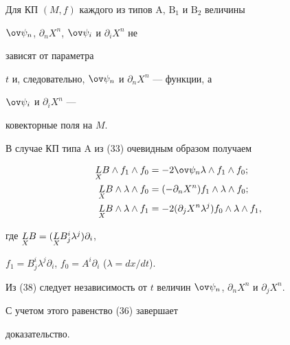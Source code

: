  


\begin{lem} 


Для КП $(M,f)$ каждого из типов $\mathrm A$, $\mathrm B_1$ и $\mathrm 


B_2$ величины 


$\ov\psi_n$, $\partial_n X^n$, $\ov\psi_i$ и $\partial_i X^n$ не 


зависят от параметра 


$t$ и, следовательно, $\ov\psi_n$ и $\partial_n X^n$ --- функции, а 


$\ov\psi_i$ и $\partial_i X^n$ --- 


ковекторные поля на $M$. 


\end{lem} 


 


\begin{pf} 


В случае КП типа A из (33) очевидным образом получаем 


\begin{align} 


\down{X}{L}B\wedge f_1\wedge f_0&=-2\ov\psi_n\lambda 


\wedge f_1\wedge f_0;\notag\\ 


% 


\down{X}{L}B\wedge\lambda\wedge f_0&=(-\partial_n X^n) 


f_1\wedge\lambda\wedge f_0;\\ 


% 


\down{X}{L}B\wedge\lambda\wedge f_1&=-2(\partial_j X^n\lambda^j) 


f_0\wedge\lambda\wedge f_1,\notag 


\end{align} 


где $\underset{X}{L}{}B=(\underset{X}{L}{}B^i_j\lambda^j)\partial_i$, 


$f_1=B^i_j\lambda^j\partial_i$, $f_0=A^i\partial_i$ ($\lambda=dx/dt$). 


 


Из (38) следует независимость от $t$ величин $\ov\psi_n$, $\partial_n 


X^n$ и $\partial_j X^n$. 


С учетом этого равенство (36) завершает 


доказательство. 


\end{pf} 


